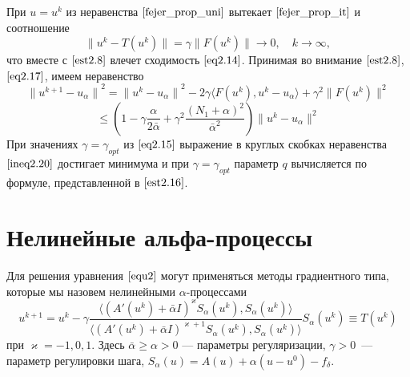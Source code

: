 При $u=u^k$ из неравенства $\eqref{fejer_prop_uni}$ вытекает $\eqref{fejer_prop_it}$ и соотношение
$$ \|u^k-T(u^k)\|=\gamma\|F(u^k)\|\to 0, \quad k\to\infty,$$ что вместе с $\eqref{est2.8}$ влечет сходимость $\eqref{eq2.14}$.
Принимая во внимание $\eqref{est2.8}$, $\eqref{eq2.17}$, имеем неравенство
$$ {\|u^{k+1}-u_\alpha\|}^2={\|u^k-u_\alpha\|}^2-2\gamma\langle F(u^k), u^k-u_\alpha\rangle+{\gamma}^2\|F(u^k)\|^2 $$
\begin{equation}\label{ineq2.20}
\le \left (1-\gamma\frac{\alpha}{2\bar\alpha}+{\gamma}^2\frac{(N_1+\alpha)^2}{{\bar\alpha}^2}\right )\|u^k-u_\alpha\|^2
\end{equation}
При значениях $\gamma={\gamma}_{opt}$ из $\eqref{eq2.15}$ выражение в круглых скобках неравенства $\eqref{ineq2.20}$ достигает минимума и при $\gamma={\gamma}_{opt}$ параметр $q$ вычисляется по формуле, представленной в $\eqref{est2.16}$.

\newpage
\section{Нелинейные альфа-процессы}
Для решения уравнения $\eqref{equ2}$ могут применяться методы градиентного типа, которые мы назовем нелинейными $\alpha$-процессами
\begin{equation}\label{equ_alphaproc}
u^{k+1}=u^k-\gamma\frac{\langle (A'(u^k)+\bar\alpha I)^{\varkappa}S_\alpha(u^k), S_\alpha(u^k)\rangle }{\langle(A'(u^k)+\bar\alpha I)^{\varkappa+1}S_\alpha(u^k), S_\alpha(u^k)\rangle }S_\alpha(u^k)\equiv{T(u^k)}
\end{equation}
при $\varkappa=-1,0,1$. Здесь $\bar\alpha \ge \alpha >0$ --- параметры регуляризации, $\gamma>0$~--- параметр регулировки шага, $S_\alpha(u)=A(u)+\alpha(u-u^0)-f_\delta$.

